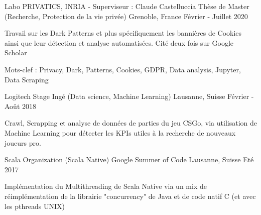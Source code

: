 \begin{cventries}
	\cventry
	{Labo PRIVATICS, INRIA - Superviseur : Claude Castelluccia} %
	{Thèse de Master (Recherche, Protection de la vie privée)} %
	{Grenoble, France} %
	{Février - Juillet 2020} %
	{ %
		\begin{cvitems}
			\item {Travail sur les Dark Patterns et plus spécifiquement les bannières de Cookies ainsi que leur détection et analyse automatisées. Cité deux fois sur Google Scholar}
			\item {Mots-clef : Privacy, Dark, Patterns, Cookies, GDPR, Data analysis, Jupyter, Data Scraping}
		\end{cvitems}
	}
	
	
	
	
	\cventry
	{Logitech} %
	{Stage Ingé (Data science, Machine Learning)} %
	{Lausanne, Suisse} %
	{Février - Août 2018} %
	{ %
		\begin{cvitems}
			\item {Crawl, Scrapping et analyse de données de parties du jeu CSGo, via utilisation de Machine Learning pour détecter les KPIs utiles à la recherche de nouveaux joueurs pro.}
		\end{cvitems}
	}
	

	\cventry
	{Scala Organization (Scala Native)} %
	{Google Summer of Code} %
	{Lausanne, Suisse} %
	{Eté 2017} %
	{ %
		\begin{cvitems}
			\item {Implémentation du Multithreading de Scala Native via un mix de réimplémentation de la librairie "concurrency" de Java et de code natif C (et avec les pthreads UNIX)}
		\end{cvitems}
	}
	

\end{cventries}
